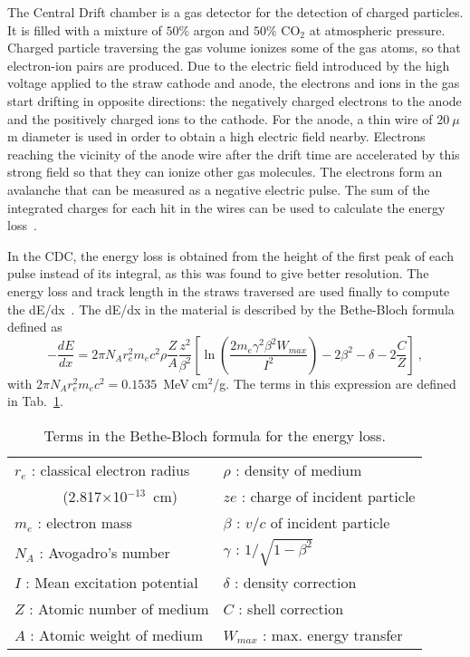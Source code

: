 The Central Drift chamber is a gas detector for the detection of charged particles. It is filled with a mixture of $50\%$ argon and $50\%$ CO$_{2}$ at atmospheric pressure. Charged particle traversing the gas volume ionizes some of the gas atoms, so that electron-ion pairs are produced. Due to the electric field introduced by the high voltage applied to the straw cathode and anode, the electrons and ions in the gas start drifting in opposite directions: the negatively charged electrons to the anode and the positively charged ions to the cathode. For the anode, a thin wire of $20~\mu$m diameter is used in order to obtain a high electric field nearby. Electrons reaching the vicinity of the anode wire after the drift time are accelerated by this strong field so that they can ionize other gas molecules. The electrons form an avalanche that can be measured as a negative electric pulse. The sum of the integrated charges for each hit in the wires can be used to calculate the energy loss~\cite{Haarlem10}.
~\par In the CDC, the energy loss is obtained from the height of the first peak of each pulse instead of its integral, as this was found to give better resolution. The energy loss and track length in the straws traversed are used finally to compute the dE/dx~\cite{Jarvis20}.
The dE/dx in the material is described by the Bethe-Bloch formula~\cite{Leo94} defined as
\begin{equation}
    \label{eq.3.1}
    -\frac{dE}{dx} = 2 \pi N_A r_e^2 m_e c^2 \rho \frac{Z}{A} \frac{z^2}{\beta^2} \left [ \ln \left( \frac{2 m_e \gamma^2 \beta^2 W_{max}}{I^2} \right) - 2 \beta^2 - \delta - 2\frac{C}{Z} \right]~,
\end{equation}
with $2 \pi N_A r_e^2 m_e c^2 = 0.1535$~MeV$~\!$cm$^2$/g. The terms in this expression are defined in Tab.~\ref{tab.3.1}.
\begin{table}[b]
    \begin{center}
        \caption{\small{Terms in the Bethe-Bloch formula for the energy loss.}}
        \label{tab.3.1}
        \begin{tabular} {||l||l||} \hline
            $r_e$ : classical electron radius   & $\rho$ : density of medium \\
            ~~~~~~ (2.817$\times$10$^{-13}$~cm) & $ze$ : charge of incident particle \\
            $m_e$ : electron mass               & $\beta$ : $v/c$ of incident particle \\
            $N_A$ : Avogadro's number           & $\gamma$ : $1/\sqrt{1 - \beta^2}$ \\
            $I$  : Mean excitation potential    & $\delta$ : density correction \\
            $Z$ : Atomic number of medium       & $C$ : shell correction \\
            $A$ : Atomic weight of medium       & $W_{max}$ : max. energy transfer \\ \hline
        \end{tabular}
    \end{center}
\end{table}
